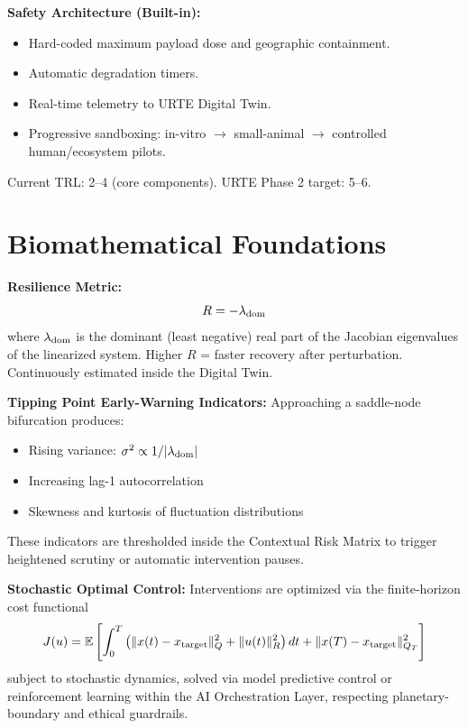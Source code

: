 \documentclass[11pt,a4paper]{report}
\begin{document}
\textbf{Safety Architecture (Built-in):}
\begin{itemize}
    \item Hard-coded maximum payload dose and geographic containment.
    \item Automatic degradation timers.
    \item Real-time telemetry to URTE Digital Twin.
    \item Progressive sandboxing: in-vitro $\to$ small-animal $\to$ controlled human/ecosystem pilots.
\end{itemize}

Current TRL: 2--4 (core components). URTE Phase 2 target: 5--6.

\section{Biomathematical Foundations}

\textbf{Resilience Metric:}
\begin{equation}
R = -\lambda_{\rm dom}
\end{equation}
where \(\lambda_{\rm dom}\) is the dominant (least negative) real part of the Jacobian eigenvalues of the linearized system. Higher \(R\) = faster recovery after perturbation. Continuously estimated inside the Digital Twin.

\textbf{Tipping Point Early-Warning Indicators:}
Approaching a saddle-node bifurcation produces:
\begin{itemize}
    \item Rising variance: \(\sigma^2 \propto 1/|\lambda_{\rm dom}|\)
    \item Increasing lag-1 autocorrelation
    \item Skewness and kurtosis of fluctuation distributions
\end{itemize}
These indicators are thresholded inside the Contextual Risk Matrix to trigger heightened scrutiny or automatic intervention pauses.

\textbf{Stochastic Optimal Control:}
Interventions are optimized via the finite-horizon cost functional
\begin{equation}
J(u) = \mathbb{E}\left[ \int_0^T \left( \|x(t) - x_{\rm target}\|_Q^2 + \|u(t)\|_R^2 \right) dt + \|x(T) - x_{\rm target}\|_{Q_T}^2 \right]
\end{equation}
subject to stochastic dynamics, solved via model predictive control or reinforcement learning within the AI Orchestration Layer, respecting planetary-boundary and ethical guardrails.
\end{document}
